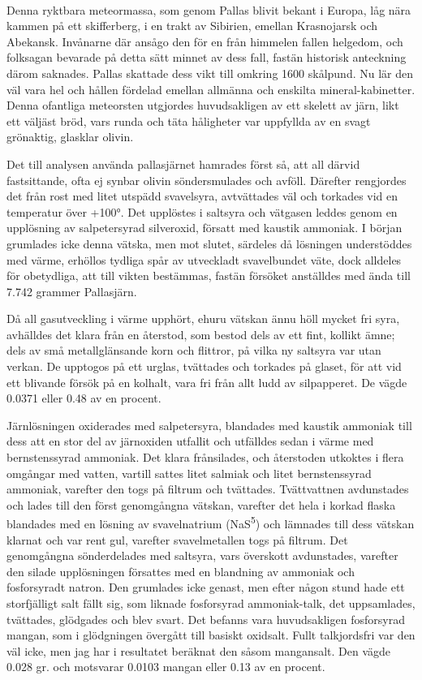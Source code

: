 \documentclass[a4paper, 12pt, oneside, swedish]{article}
\begin{document}
\paragraph{}
Denna ryktbara meteormassa, som genom Pallas blivit bekant i Europa, låg nära kammen på ett skifferberg, i en trakt av Sibirien, emellan Krasnojarsk och Abekansk. Invånarne där ansågo den för en från himmelen fallen helgedom, och folksagan bevarade på detta sätt minnet av dess fall, fastän historisk anteckning därom saknades. Pallas skattade dess vikt till omkring 1600 skålpund. Nu lär den väl vara hel och hållen fördelad emellan allmänna och enskilta mineral-kabinetter. Denna ofantliga meteorsten utgjordes huvudsakligen av ett skelett av järn, likt ett väljäst bröd, vars runda och täta håligheter var uppfyllda av en svagt grönaktig, glasklar olivin.

Det till analysen använda pallasjärnet hamrades först så, att all därvid fastsittande, ofta ej synbar olivin söndersmulades och avföll. Därefter rengjordes det från rost med litet utspädd svavelsyra, avtvättades väl och torkades vid en temperatur över +100°. Det upplöstes i saltsyra och vätgasen leddes genom en upplösning av salpetersyrad silveroxid, försatt med kaustik ammoniak. I början grumlades icke denna vätska, men mot slutet, särdeles då lösningen understöddes med värme, erhöllos tydliga spår av utveckladt svavelbundet väte, dock alldeles för obetydliga, att till vikten bestämmas, fastän försöket anställdes med ända till 7.742 grammer Pallasjärn.

Då all gasutveckling i värme upphört, ehuru vätskan ännu höll mycket fri syra, avhälldes det klara från en återstod, som bestod dels av ett fint, kollikt ämne; dels av små metallglänsande korn och flittror, på vilka ny saltsyra var utan verkan. De upptogos på ett urglas, tvättades och torkades på glaset, för att vid ett blivande försök på en kolhalt, vara fri från allt ludd av silpapperet. De vägde 0.0371 eller 0.48 av en procent.

Järnlösningen oxiderades med salpetersyra, blandades med kaustik ammoniak till dess att en stor del av järnoxiden utfallit och utfälldes sedan i värme med bernstenssyrad ammoniak. Det klara frånsilades, och återstoden utkoktes i flera omgångar med vatten, vartill sattes litet salmiak och litet bernstenssyrad ammoniak, varefter den togs på filtrum och tvättades. Tvättvattnen avdunstades och lades till den först genomgångna vätskan, varefter det hela i korkad flaska blandades med en lösning av svavelnatrium (NaS\textsuperscript{5}) och lämnades till dess vätskan klarnat och var rent gul, varefter svavelmetallen togs på filtrum. Det genomgångna sönderdelades med saltsyra, vars överskott avdunstades, varefter den silade upplösningen försattes med en blandning av ammoniak och fosforsyradt natron. Den grumlades icke genast, men efter någon stund hade ett storfjälligt salt fällt sig, som liknade fosforsyrad ammoniak-talk, det uppsamlades, tvättades, glödgades och blev svart. Det befanns vara huvudsakligen fosforsyrad mangan, som i glödgningen övergått till basiskt oxidsalt. Fullt talkjordsfri var den väl icke, men jag har i resultatet beräknat den såsom mangansalt. Den vägde 0.028 gr. och motsvarar 0.0103 mangan eller 0.13 av en procent.
\end{document}
